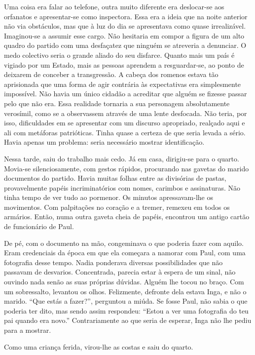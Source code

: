 Uma coisa era falar ao telefone, outra muito diferente era deslocar-se
aos orfanatos e apresentar-se como inspectora. Essa era a ideia que na
noite anterior não via obstáculos, mas que à luz do dia se apresentava
como quase irrealizável. Imaginou-se a assumir esse cargo. Não hesitaria em compor a figura de um alto quadro do partido com uma desfaçatez
que ninguém se atreveria a denunciar. O medo colectivo seria o grande
aliado do seu disfarce. Quanto mais um país é vigiado por um Estado,
mais as pessoas aprendem a resguardar-se, ao ponto de deixarem de
conceber a transgressão. A cabeça dos romenos estava tão aprisionada que
uma forma de agir contrária às expectativas era simplesmente
impossível. Não havia um único cidadão a acreditar que alguém se fizesse
passar pelo que não era. Essa realidade tornaria a sua personagem
absolutamente verosímil, como se a observassem através de uma lente desfocada.
Não teria, por isso, dificuldades em se apresentar com um discurso
apropriado, realçado aqui e ali com metáforas patrióticas. Tinha quase a
certeza de que seria levada a sério. Havia apenas um problema: seria
necessário mostrar identificação.

Nessa tarde, saiu do trabalho mais cedo. Já em casa, dirigiu-se para o
quarto. Movia-se silenciosamente, com gestos rápidos, procurando nas
gavetas do marido documentos do partido. Havia muitas folhas entre as
divisórias de pastas, provavelmente papéis incriminatórios com nomes,
carimbos e assinaturas. Não tinha tempo de ver tudo ao pormenor. Os
minutos apressavam-lhe os movimentos. Com palpitações no coração e a
tremer, remexeu em todos os armários. Então, numa outra gaveta cheia de
papéis, encontrou um antigo cartão de funcionário de Paul.

De pé, com o documento na mão, congeminava o que poderia fazer com
aquilo. Eram credenciais da época em que ela começara a namorar com
Paul, com uma fotografia desse tempo. Nadia ponderava diversas
possibilidades que não passavam de desvarios. Concentrada, parecia estar
à espera de um sinal, não ouvindo nada senão as suas próprias dúvidas.
Alguém lhe tocou no braço. Com um sobressalto, levantou os olhos.
Felizmente, defronte dela estava Inga, e não o marido. ``Que estás a
fazer?'', perguntou a miúda. Se fosse Paul, não sabia o que poderia ter
dito, mas sendo assim respondeu: ``Estou a ver uma fotografia do teu pai
quando era novo.'' Contrariamente ao que seria de esperar, Inga não lhe
pediu para a mostrar.


Como uma criança ferida, virou-lhe as costas e saiu do quarto.

